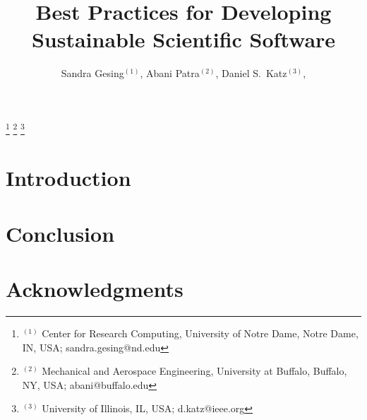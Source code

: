 \documentclass[11pt, oneside]{amsart}
\begin{document}
\title[]{Best Practices for Developing Sustainable Scientific Software}

\author{Sandra Gesing$^{(1)}$,
Abani Patra$^{(2)}$,
Daniel S.\ Katz$^{(3)}$,
}

%
\thanks{{}$^{(1)}$ \hspace{-1ex}Center for Research Computing, University of Notre Dame, Notre Dame, IN, USA; sandra.gesing@nd.edu}
%
\thanks{{}$^{(2)}$ Mechanical and Aerospace Engineering, University at Buffalo, Buffalo, NY, USA; abani@buffalo.edu}
%
\thanks{{}$^{(3)}$ University of Illinois, IL, USA; d.katz@ieee.org}
%
 
\begin{abstract}


\end{abstract}

\maketitle
\newpage

\section{Introduction} \label{sec:intro}









\section{Conclusion} \label{sec:conclusion}

\section*{Acknowledgments} \label{sec:acks}






\end{document}
